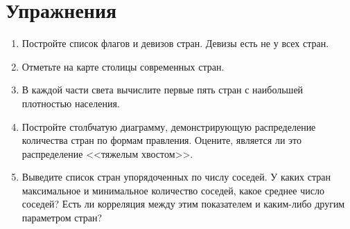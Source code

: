 \section{Упражнения}

\begin{enumerate}
	\item Постройте список флагов и девизов стран. Девизы есть не у всех стран.
	\item Отметьте на карте столицы современных стран.
	\item В каждой части света вычислите первые пять стран с наибольшей плотностью населения.
	\item Постройте столбчатую диаграмму, демонстрирующую распределение количества стран по формам правления. Оцените, является ли это распределение <<тяжелым хвостом>>.
	\item Выведите список стран упорядоченных по числу соседей. У каких стран максимальное и минимальное количество соседей, какое среднее число соседей? Есть ли корреляция между этим показателем и каким-либо другим параметром стран?
\end{enumerate}
